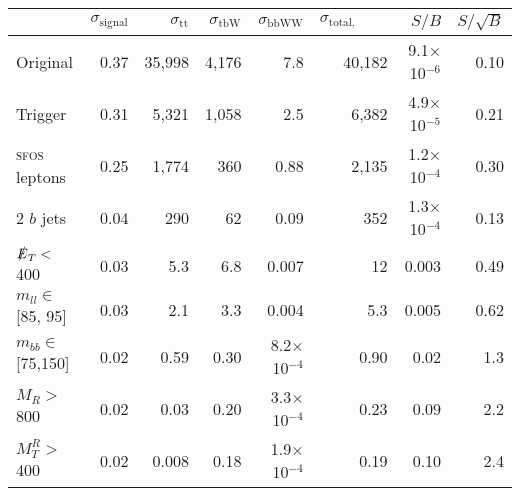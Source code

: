 \begin{tabular}{lrrrrrrr}
\toprule
{} &  $\sigma_\text{signal}$ &  $\sigma_\text{tt}$ &  $\sigma_\text{tbW}$ &  $\sigma_\text{bbWW}$ &  $\sigma_\text{total, background}$ &   $S/B$ &  $S/\sqrt{B}$ \\
\midrule
Original            & 0.37 & 35,998 & 4,176 & 7.8     & 40,182 & 9.1$\times$ 10$^{-6}$ & 0.10 \\
Trigger             & 0.31 & 5,321  & 1,058 & 2.5     & 6,382  & 4.9$\times$ 10$^{-5}$ & 0.21 \\
\textsc{sfos} leptons        & 0.25 & 1,774  & 360   & 0.88    & 2,135  & 1.2$\times$ 10$^{-4}$ & 0.30 \\
2 $b$ jets          & 0.04 & 290    & 62    & 0.09    & 352    & 1.3$\times$ 10$^{-4}$ & 0.13 \\
$\slashed{E}_T <$ 400         & 0.03 & 5.3    & 6.8   & 0.007   & 12     & 0.003               & 0.49 \\
$m_{ll} \in$ [85, 95]  & 0.03 & 2.1    & 3.3   & 0.004   & 5.3    & 0.005               & 0.62 \\
$m_{bb}\in$ [75,150] & 0.02 & 0.59   & 0.30  & 8.2$\times$ 10$^{-4}$ & 0.90   & 0.02                & 1.3 \\
$M_{R} >$ 800       & 0.02 & 0.03   & 0.20  & 3.3$\times$ 10$^{-4}$ & 0.23   & 0.09                & 2.2 \\
$M_{T}^{R} >$ 400   & 0.02 & 0.008  & 0.18  & 1.9$\times$ 10$^{-4}$ & 0.19   & 0.10                & 2.4 \\
\bottomrule
\end{tabular}
